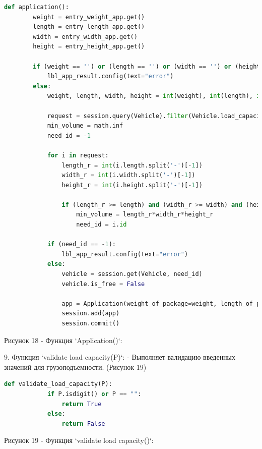 \documentclass[14pt]{extreport}
\begin{document}
    \begin{lstlisting}[language=Python]
    def application():
        weight = entry_weight_app.get()
        length = entry_length_app.get()
        width = entry_width_app.get()
        height = entry_height_app.get()
    
        if (weight == '') or (length == '') or (width == '') or (height == ''):
            lbl_app_result.config(text="error")
        else:
            weight, length, width, height = int(weight), int(length), int(width), int(height)
    
            request = session.query(Vehicle).filter(Vehicle.load_capacity >= weight).filter(Vehicle.is_free == True)
            min_volume = math.inf
            need_id = -1
    
            for i in request:
                length_r = int(i.length.split('-')[-1])
                width_r = int(i.width.split('-')[-1])
                height_r = int(i.height.split('-')[-1])
    
                if (length_r >= length) and (width_r >= width) and (height_r >= height) and (length_r*width_r*height_r <= min_volume):
                    min_volume = length_r*width_r*height_r
                    need_id = i.id
    
            if (need_id == -1):
                lbl_app_result.config(text="error")
            else:
                vehicle = session.get(Vehicle, need_id)
                vehicle.is_free = False
                
                app = Application(weight_of_package=weight, length_of_package=length, width_of_package=width, height_of_package=height, vehicle_id=need_id)
                session.add(app)
                session.commit()
    \end{lstlisting}
    \begin{center}
        Рисунок 18 - Функция `Application()`:
    \end{center}
9. Функция `validate load capacity(P)`:
    - Выполняет валидацию введенных значений для грузоподъемности. (Рисунок 19)
    \begin{lstlisting}[language=Python]
        def validate_load_capacity(P):
            if P.isdigit() or P == "":
                return True
            else:
                return False
    \end{lstlisting}
    \begin{center}
        Рисунок 19 - Функция `validate load capacity()`:
    \end{center}
\end{document}
